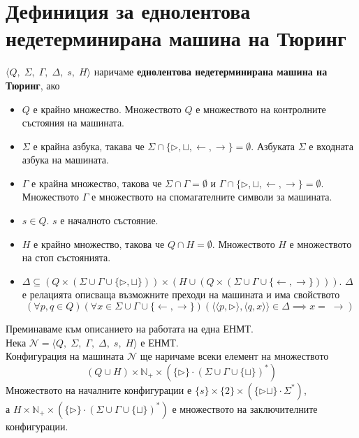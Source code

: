 \documentclass[14pt]{extarticle}
\begin{document}
\section*{Дефиниция за еднолентова недетерминирана машина на Тюринг}
\(\langle Q,\; \Sigma,\; \Gamma,\; \Delta,\; s,\; H \rangle\) наричаме \textbf{еднолентова недетерминирана машина на Тюринг}, ако
\begin{itemize}
    \item \(Q\) е крайно множество. Множеството \(Q\) е множеството на контролните състояния на машината.
    \item \(\Sigma\) е крайна азбука, такава че \(\Sigma \cap \{\triangleright, \sqcup, \leftarrow, \rightarrow\} = \emptyset\). Азбуката \(\Sigma\) е входната азбука на машината.
    \item \(\Gamma\) е крайна множество, такова че \(\Sigma \cap \Gamma = \emptyset\) и \(\Gamma \cap \{\triangleright, \sqcup, \leftarrow, \rightarrow\} = \emptyset\). Множеството \(\Gamma\) е множеството на спомагателните символи за машината.
    \item \(s \in Q\). \(s\) е началното състояние.
    \item \(H\) е крайно множество, такова че \(Q \cap H = \emptyset\). Множеството \(H\) е множеството на стоп състоянията.
    \item \(\Delta \subseteq (Q \times (\Sigma \cup \Gamma \cup \{ \triangleright, \sqcup \})) \times (H \cup (Q \times (\Sigma \cup \Gamma \cup \{\leftarrow, \rightarrow\})))\). \(\Delta\) е релацията описваща възможните преходи на машината и има свойството
    \[(\forall p, q \in Q)(\forall x \in \Sigma \cup \Gamma \cup \{\leftarrow, \rightarrow\})(\langle \langle p, \triangleright \rangle, \langle q, x \rangle \rangle \in \Delta \implies x = \;\rightarrow )\]
\end{itemize}
Преминаваме към описанието на работата на една ЕНМТ. \\
Нека \(\mathcal N  = \langle Q,\; \Sigma,\; \Gamma,\; \Delta,\; s,\; H \rangle\) е ЕНМТ. \\
Конфигурация на машината \(\mathcal N\) ще наричаме всеки елемент на множеството
\[ (Q \cup H) \times \mathbb{N}_+ \times (\{\triangleright\} \cdot (\Sigma \cup \Gamma \cup \{\sqcup\})^* ) \]
Множеството на началните конфигурации е \( \{s\} \times \{2\} \times (\{\triangleright\sqcup\} \cdot \Sigma^* ) \), \\
а \( H \times \mathbb{N}_+ \times (\{\triangleright\} \cdot (\Sigma \cup \Gamma \cup \{\sqcup\})^* ) \) е множеството на заключителните конфигурации. \\
\end{document}
